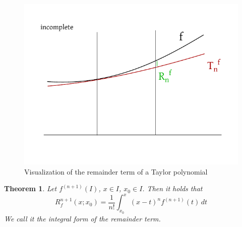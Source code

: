 \documentclass{article}
\newtheorem{theorem}{Theorem}  \numberwithin{theorem}{section}
\begin{document}
\begin{figure}[t]
  \begin{center}
    \includegraphics{img/27_taylor_remainder.pdf}
    \caption{Visualization of the remainder term of a Taylor polynomial}
    \label{img:taylor-rem}
  \end{center}
\end{figure}

\begin{theorem} %
  \label{thm4} 
  Let $f^{(n+1)}(I)$, $x \in I$, $x_0 \in I$. Then it holds that
  \[ R_f^{n+1}(x; x_0) = \frac1{n!} \int_{x_0}^x (x - t)^n f^{(n+1)}(t) \, dt \]
  We call it the \emph{integral form of the remainder term}.
\end{theorem}
\end{document}
